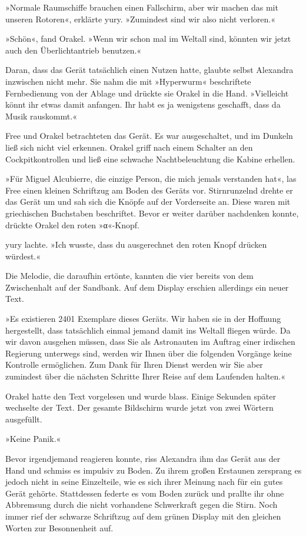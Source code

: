 »Normale Raumschiffe brauchen einen Fallschirm, aber wir machen das mit unseren Rotoren«, erklärte yury. »Zumindest sind wir also nicht verloren.«

»Schön«, fand Orakel. »Wenn wir schon mal im Weltall sind, könnten wir jetzt auch den Überlichtantrieb benutzen.«

Daran, dass das Gerät tatsächlich einen Nutzen hatte, glaubte selbst Alexandra inzwischen nicht mehr. Sie nahm die mit »Hyperwurm« beschriftete Fernbedienung von der Ablage und drückte sie Orakel in die Hand. »Vielleicht könnt ihr etwas damit anfangen. Ihr habt es ja wenigstens geschafft, dass da Musik rauskommt.«

Free und Orakel betrachteten das Gerät. Es war ausgeschaltet, und im Dunkeln ließ sich nicht viel erkennen. Orakel griff nach einem Schalter an den Cockpitkontrollen und ließ eine schwache Nachtbeleuchtung die Kabine erhellen.

»Für Miguel Alcubierre, die einzige Person, die mich jemals verstanden hat«, las Free einen kleinen Schriftzug am Boden des Geräts vor. Stirnrunzelnd drehte er das Gerät um und sah sich die Knöpfe auf der Vorderseite an. Diese waren mit griechischen Buchstaben beschriftet. Bevor er weiter darüber nachdenken konnte, drückte Orakel den roten »α«-Knopf.

yury lachte. »Ich wusste, dass du ausgerechnet den roten Knopf drücken würdest.«

Die Melodie, die daraufhin ertönte, kannten die vier bereits von dem Zwischenhalt auf der Sandbank. Auf dem Display erschien allerdings ein neuer Text.

»Es existieren 2401 Exemplare dieses Geräts. Wir haben sie in der Hoffnung hergestellt, dass tatsächlich einmal jemand damit ins Weltall fliegen würde. Da wir davon ausgehen müssen, dass Sie als Astronauten im Auftrag einer irdischen Regierung unterwegs sind, werden wir Ihnen über die folgenden Vorgänge keine Kontrolle ermöglichen. Zum Dank für Ihren Dienst werden wir Sie aber zumindest über die nächsten Schritte Ihrer Reise auf dem Laufenden halten.«

Orakel hatte den Text vorgelesen und wurde blass. Einige Sekunden später wechselte der Text. Der gesamte Bildschirm wurde jetzt von zwei Wörtern ausgefüllt.

»Keine Panik.«

Bevor irgendjemand reagieren konnte, riss Alexandra ihm das Gerät aus der Hand und schmiss es impulsiv zu Boden. Zu ihrem großen Erstaunen zersprang es jedoch nicht in seine Einzelteile, wie es sich ihrer Meinung nach für ein gutes Gerät gehörte. Stattdessen federte es vom Boden zurück und prallte ihr ohne Abbremsung durch die nicht vorhandene Schwerkraft gegen die Stirn. Noch immer rief der schwarze Schriftzug auf dem grünen Display mit den gleichen Worten zur Besonnenheit auf.

